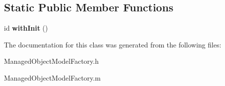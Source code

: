 \subsection*{\-Static \-Public \-Member \-Functions}
\begin{DoxyCompactItemize}
\item 
\hypertarget{interface_managed_object_model_factory_a8b0c25350abca60312956ebf132c9c78}{
id {\bfseries with\-Init} ()}
\label{interface_managed_object_model_factory_a8b0c25350abca60312956ebf132c9c78}

\end{DoxyCompactItemize}


\-The documentation for this class was generated from the following files\-:\begin{DoxyCompactItemize}
\item 
\-Managed\-Object\-Model\-Factory.\-h\item 
\-Managed\-Object\-Model\-Factory.\-m\end{DoxyCompactItemize}
